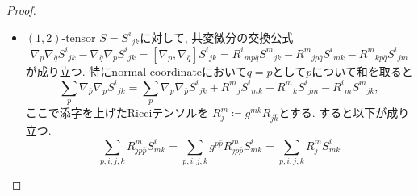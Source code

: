 \documentclass[dvipdfmx,a4paper,11pt]{article} %
\theoremstyle{definition}
\theoremstyle{remark}
\numberwithin{equation}{section}
\begin{document}
\begin{proof}
\begin{tcolorbox}[mybox]
\begin{itemize}
\item $(1,2)$-tensor $S=S^i{}_{jk}$に対して, 共変微分の交換公式
\[
\nabla_p\nabla_{\bar q}S^i{}_{jk}
-
\nabla_{\bar q}\nabla_pS^i{}_{jk}
=
[\nabla_p,\nabla_{\bar q}]S^i{}_{jk}
=
R^i{}_{mp\bar q}S^m{}_{jk}
-R^m{}_{jp\bar q}S^i{}_{mk}
-R^m{}_{kp\bar q}S^i{}_{jm}
\]
が成り立つ. 特にnormal coordinateにおいて$q=p$として$p$について和を取ると
\begin{equation}
\label{eq-covariant-formula}
\sum_p\nabla_{\bar p}\nabla_pS^i{}_{jk}
=
\sum_p\nabla_p\nabla_{\bar p}S^i{}_{jk}
+
R^m{}_jS^i{}_{mk}
+
R^m{}_kS^i{}_{jm}
-
R^i{}_mS^m{}_{jk},
\end{equation}
ここで添字を上げたRicciテンソルを
$R^{m}_{j}
\coloneqq g^{m\bar k}R_{j\bar k}$とする. 
すると以下が成り立つ. 
\[
\sum_{p, i,j,k}R^{m}_{jp\bar p}S^{i}_{mk}
=
\sum_{p, i,j,k}g^{p\bar{p}}R^{m}_{jp\bar p}S^{i}_{mk}
=
\sum_{p, i,j,k}R^{m}_{j}S^{i}_{mk}
\]


\end{itemize}
\end{tcolorbox}
\end{proof}
\end{document}
